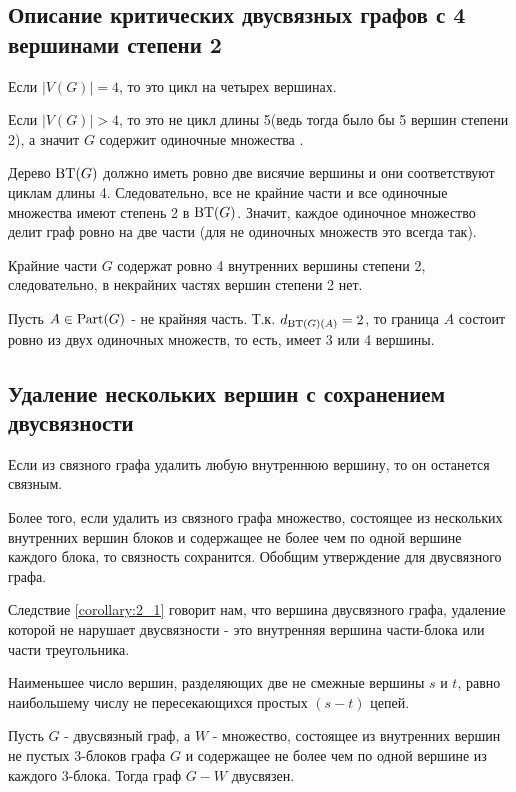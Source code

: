 \subsection{Описание критических двусвязных графов с 4 вершинами степени 2}

Если $|V(G)| = 4$, то это цикл на четырех вершинах.

Если  $|V(G)| > 4$, то это не цикл длины 5(ведь тогда было бы 5 вершин степени 2), а значит  $G$ содержит одиночные множества .

Дерево $\operatorname{BT}(G)$ должно иметь ровно две висячие вершины и они соответствуют циклам длины 4.
Следовательно, все не крайние части и все одиночные множества имеют степень 2 в $\operatorname{BT}(G)$.
Значит, каждое одиночное множество делит граф ровно на две части (для не одиночных множеств это всегда так).

Крайние части $G$ содержат ровно 4 внутренних вершины степени 2, следовательно, в некрайних частях вершин степени 2 нет.

Пусть $A \in \operatorname{Part}(G)$ - не крайняя часть.
Т.к. $d_{\operatorname{BT}(G)(A)} = 2$, то граница  $A$ состоит ровно из двух одиночных множеств, то есть, имеет 3 или 4 вершины.


\subsection{Удаление нескольких вершин с сохранением двусвязности}

Если из связного графа удалить любую внутреннюю вершину, то он останется связным.

Более того, если удалить из связного графа множество, состоящее из нескольких внутренних вершин блоков и содержащее не более чем по одной вершине каждого блока, то связность сохранится.
Обобщим утверждение для двусвязного графа.

Следствие \ref{corollary:2_1} говорит нам, что вершина двусвязного графа, удаление которой не нарушает двусвязности - это внутренняя вершина части-блока или части треугольника.

\begin{remrk} \label{theorem:menger}
	Наименьшее число вершин, разделяющих две не смежные вершины $s$ и  $t$, равно наибольшему числу не пересекающихся простых $(s - t)$ цепей.
\end{remrk}

\begin{thm}[Теорема 2.4] \label{theorem:2_4}
	Пусть $G$ - двусвязный граф, а $W$ - множество, состоящее из внутренних вершин не пустых 3-блоков графа  $G$ и содержащее не более чем по одной вершине из каждого 3-блока.
	Тогда граф  $G - W$ двусвязен.
\end{thm}

